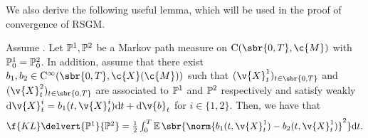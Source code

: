 We also derive the following useful lemma, which will be used in the proof of convergence of RSGM.

\begin{corollary}
	\label{col:KL_diff}
	Assume .
	Let $\bb{P}^1, \bb{P}^2$ be a Markov path measure on $\mathrm{C}(\sbr{0,T}, \c{M})$ with $\bb{P}_0^1 = \bb{P}_0^2$.
	In addition, assume that there exist $b_1,b_2 \in \mathrm{C}^\infty(\sbr{0,T}, \c{X}(\c{M}))$ such that $(\v{X}_t^1)_{t \in \sbr{0,T}}$ and $(\v{X}_t^2)_{t \in \sbr{0,T}}$ are associated to $\bb{P}^1$ and $\bb{P}^2$ respectively and satisfy weakly $\mathrm{d} \v{X}_t^i = b_1(t,\v{X}_t^i) \mathrm{d} t + \mathrm{d} \v{b}_t$ for $i \in \{1,2\}$.
	Then, we have that \begin{equation} \textstyle{\f{KL}\delvert{\bb{P}^1}{\bb{P}^2} = \tfrac{1}{2} \int_0^T \E\sbr{\norm{b_1(t,\v{X}_t^1) - b_2(t,\v{X}_t^1)}^2} \mathrm{d} t .
		}
	\end{equation}
\end{corollary}

